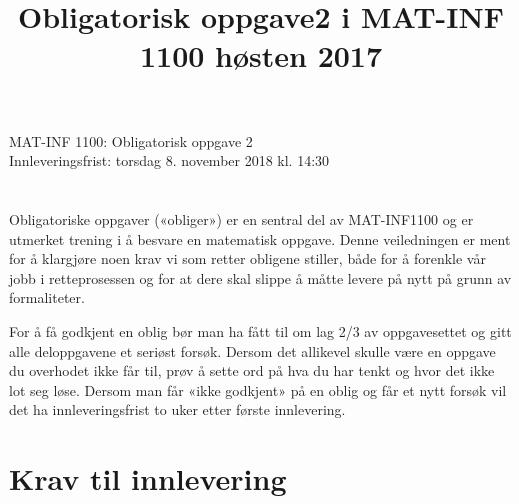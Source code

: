 \documentclass[11pt,norsk,a4paper]{article}
\title{Obligatorisk oppgave2 i MAT-INF 1100 høsten 2017}
\begin{document}

\begin{center}\huge MAT-INF 1100: Obligatorisk oppgave 2\\
     \vspace{5mm}
\Large  Innleveringsfrist: torsdag 8. november 2018 kl. 14:30
\end{center}

\section*{}
Obligatoriske oppgaver («obliger») er en sentral del av MAT-INF1100 og er utmerket trening i å besvare en matematisk oppgave.
Denne veiledningen er ment for å klargjøre noen krav vi som retter obligene stiller, både for å forenkle vår jobb i retteprosessen og for at dere skal slippe å måtte levere på nytt på grunn av formaliteter.

For å få godkjent en oblig bør man ha fått til om lag 2/3 av oppgavesettet og gitt alle deloppgavene et seriøst forsøk. 
Dersom det allikevel skulle være en oppgave du overhodet ikke får til, prøv å sette ord på hva du har tenkt og hvor det ikke lot seg løse.
Dersom man får «ikke godkjent» på en oblig og får et nytt forsøk vil det ha innleveringsfrist to uker etter første innlevering.  

\section{Krav til innlevering}
\end{document}
